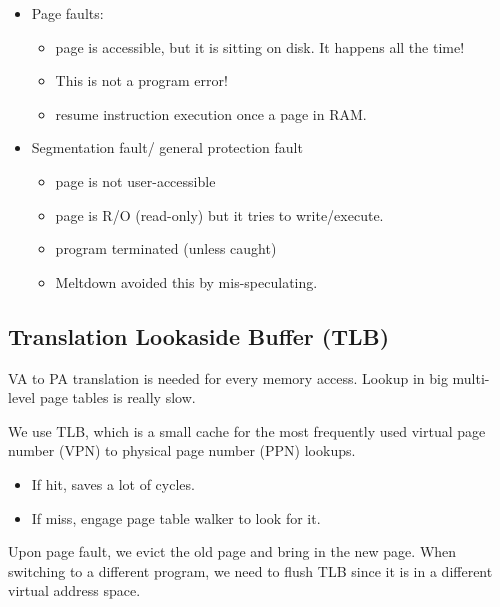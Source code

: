 \documentclass[letterpaper,12pt]{article}
\begin{document}
\begin{itemize}
    \item Page faults:
          \begin{itemize}
              \item page is accessible, but it is sitting on disk. It happens all the time!
              \item This is not a program error!
              \item resume instruction execution once a page in RAM.
          \end{itemize}
    \item Segmentation fault/ general protection fault
          \begin{itemize}
              \item page is not user-accessible
              \item page is R/O (read-only) but it tries to write/execute.
              \item program terminated (unless caught)
              \item Meltdown avoided this by mis-speculating.
          \end{itemize}
\end{itemize}

\subsection{Translation Lookaside Buffer (TLB)}

VA to PA translation is needed for every memory access. Lookup in big multi-level page tables is really slow.

We use TLB, which is a small cache for the most frequently used virtual page number (VPN) to physical page number (PPN) lookups.

\begin{itemize}
    \item If hit, saves a lot of cycles.
    \item If miss, engage page table walker to look for it.
\end{itemize}

Upon page fault, we evict the old page and bring in the new page. When switching to a different program, we need to flush TLB since it is in a different virtual address space.
\end{document}
